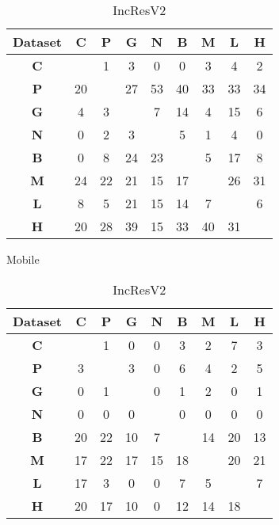 \begin{table}
  \centering
  \small
  \begin{subtable}[h]{0.45\textwidth}
    \centering
    \begin{tabular}{|c|cccccccc|} 
    \hline
    Dataset & \textbf{C} & \textbf{P} & \textbf{G} & \textbf{N} & \textbf{B} & \textbf{M} & \textbf{L} & \textbf{H}\\
    \hline
    \textbf{C} &   & 1 & 3 & 0 & 0 & 3 & 4 & 2 \\
    \textbf{P} & 20 &   & 27 & 53 & 40 & 33 & 33 & 34 \\
    \textbf{G} & 4 & 3 &   & 7 & 14 & 4 & 15 & 6 \\
    \textbf{N} & 0 & 2 & 3 &   & 5 & 1 & 4 & 0 \\
    \textbf{B} & 0 & 8 & 24 & 23 &   & 5 & 17 & 8 \\
    \textbf{M} & 24 & 22 & 21 & 15 & 17 &   & 26 & 31 \\
    \textbf{L} & 8 & 5 & 21 & 15 & 14 & 7 &   & 6 \\
    \textbf{H} & 20 & 28 & 39 & 15 & 33 & 40 & 31 & \\
    \hline
    \end{tabular}
    \caption{Mobile}
  \end{subtable}

  \begin{subtable}[h]{0.45\textwidth}
    \centering
    \begin{tabular}{|c|cccccccc|} 
    \hline
    Dataset & \textbf{C} & \textbf{P} & \textbf{G} & \textbf{N} & \textbf{B} & \textbf{M} & \textbf{L} & \textbf{H}\\
    \hline
    \textbf{C} &   & 1 & 0 & 0 & 3 & 2 & 7 & 3 \\
    \textbf{P} & 3 &   & 3 & 0 & 6 & 4 & 2 & 5 \\
    \textbf{G} & 0 & 1 &   & 0 & 1 & 2 & 0 & 1 \\
    \textbf{N} & 0 & 0 & 0 &   & 0 & 0 & 0 & 0 \\
    \textbf{B} & 20 & 22 & 10 & 7 &   & 14 & 20 & 13 \\
    \textbf{M} & 17 & 22 & 17 & 15 & 18 &   & 20 & 21 \\
    \textbf{L} & 17 & 3 & 0 & 0 & 7 & 5 &   & 7 \\
    \textbf{H} & 20 & 17 & 10 & 0 & 12 & 14 & 18 & \\
    \hline
    \end{tabular}
    \caption{IncResV2}
  \end{subtable} \\


\end{table}
